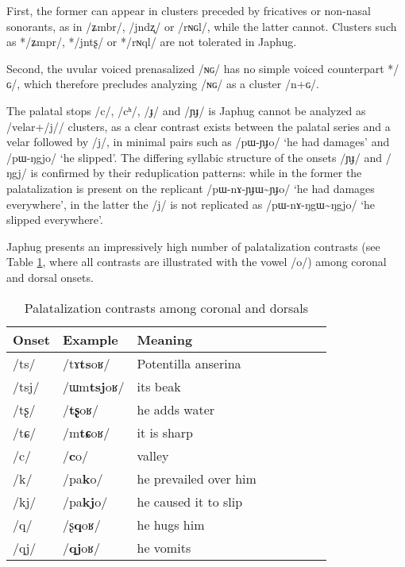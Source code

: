 \documentclass[oneside,a4paper,11pt]{article}
\newcommand{\ipa}[1]{\mbox{\phon/#1/}}
\newcommand{\tld}{\textasciitilde{}}
\begin{document}
First, the former can appear in clusters preceded by fricatives or non-nasal sonorants, as in \ipa{ʑmbr}, \ipa{jndʐ} or \ipa{rɴɢl}, while the latter cannot. Clusters such as *\ipa{ʑmpr}, *\ipa{jntʂ} or *\ipa{rɴql} are not tolerated in Japhug.

Second, the uvular voiced prenasalized \ipa{ɴɢ} has no simple voiced counterpart *\ipa{ɢ}, which therefore precludes analyzing \ipa{ɴɢ} as a cluster \ipa{n+ɢ}.



The palatal stops \ipa{c}, \ipa{cʰ}, \ipa{ɟ} and \ipa{ɲɟ} is Japhug cannot be analyzed as /velar+\ipa{j}/ clusters, as a clear contrast exists between the palatal series and a velar followed by \ipa{j}, in minimal pairs such as   \ipa{pɯ-ɲɟo} `he had damages' and \ipa{pɯ-ŋgjo} `he slipped'. The differing syllabic structure of the onsets \ipa{ɲɟ} and \ipa{ŋgj} is confirmed by their reduplication patterns: while in the former the palatalization is present on the replicant \ipa{pɯ-nɤ-ɲɟɯ\tld{}ɲɟo} `he had damages everywhere', in the latter the \ipa{j} is not replicated as  \ipa{pɯ-nɤ-ŋgɯ\tld{}ŋgjo} `he slipped everywhere'.

Japhug   presents an impressively high number of palatalization contrasts (see Table \ref{tab:coronal.dorsal}, where all contrasts are illustrated with the vowel \ipa{o}) among coronal and dorsal onsets. 

		   \begin{table}
 \caption{Palatalization contrasts among coronal and dorsals } \label{tab:coronal.dorsal}  \centering
\begin{tabular}{llllllll}
\toprule		
Onset & Example & Meaning \\
\midrule
\ipa{ts} &\ipa{tɤ\textbf{ts}oʁ}  & Potentilla anserina \\
\ipa{tsj} &     \ipa{ɯm\textbf{tsj}oʁ}  & its beak \\
\ipa{tʂ} &\ipa{\textbf{tʂ}oʁ}  & he adds water \\
\ipa{tɕ} &\ipa{m\textbf{tɕ}oʁ}  &it is sharp\\
\ipa{c} & \ipa{\textbf{c}o}  & valley \\
 \ipa{k} & \ipa{pa\textbf{k}o}  & he prevailed over him \\
 \ipa{kj} & \ipa{pa\textbf{kj}o}  & he caused it to slip \\
 \ipa{q} & \ipa{ʂ\textbf{q}oʁ}  &he hugs him \\
 \ipa{qj} & \ipa{\textbf{qj}oʁ}  & he vomits \\
 \bottomrule
\end{tabular}
\end{table}
 
\end{document}
